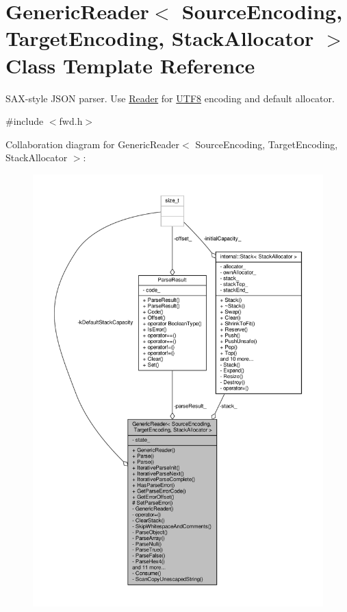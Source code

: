 \hypertarget{classGenericReader}{}\section{Generic\+Reader$<$ Source\+Encoding, Target\+Encoding, Stack\+Allocator $>$ Class Template Reference}
\label{classGenericReader}


S\+A\+X-\/style J\+S\+ON parser. Use \hyperlink{reader_8h_a84f3b66a66647f4ac4267078359188ba}{Reader} for \hyperlink{structUTF8}{U\+T\+F8} encoding and default allocator.  




{\ttfamily \#include $<$fwd.\+h$>$}



Collaboration diagram for Generic\+Reader$<$ Source\+Encoding, Target\+Encoding, Stack\+Allocator $>$\+:
\nopagebreak
\begin{figure}[H]
\begin{center}
\leavevmode
\includegraphics[width=350pt]{classGenericReader__coll__graph}
\end{center}
\end{figure}
